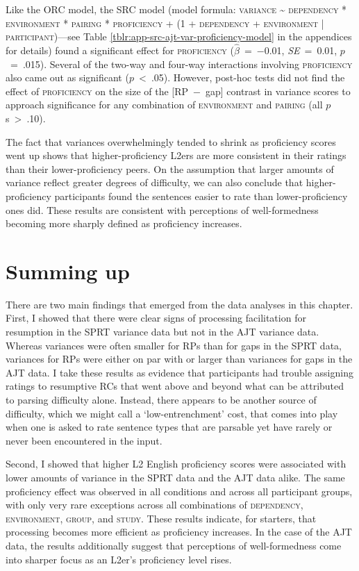 Like the ORC model, the SRC model (model formula: \textsc{variance \~{} dependency * environment * pairing * proficiency + (1 + dependency + environment | participant)}---see Table \ref{tblr:app-src-ajt-var-proficiency-model} in the appendices for details) found a significant effect for \textsc{proficiency} ($\hat{\beta}$~=~−0.01, \textit{SE}~=~0.01, $p$~=~.015). Several of the two-way and four-way interactions involving \textsc{proficiency} also came out as significant ($p$~<~.05). However, post-hoc tests did not find the effect of \textsc{proficiency} on the size of the [RP~−~gap] contrast in variance scores to approach significance for any combination of \textsc{environment} and \textsc{pairing} (all $p$s~>~.10).

The fact that variances overwhelmingly tended to shrink as proficiency scores went up shows that higher-proficiency L2ers are more consistent in their ratings than their lower-proficiency peers. On the assumption that larger amounts of variance reflect greater degrees of difficulty, we can also conclude that higher-proficiency participants found the sentences easier to rate than lower-proficiency ones did. These results are consistent with perceptions of well-formedness becoming more sharply defined as proficiency increases.

\section{Summing up}\label{var-conclusion}

There are two main findings that emerged from the data analyses in this chapter. First, I showed that there were clear signs of processing facilitation for resumption in the SPRT variance data but not in the AJT variance data. Whereas variances were often smaller for RPs than for gaps in the SPRT data, variances for RPs were either on par with or larger than variances for gaps in the AJT data. I take these results as evidence that participants had trouble assigning ratings to resumptive RCs that went above and beyond what can be attributed to parsing difficulty alone. Instead, there appears to be another source of difficulty, which we might call a `low-entrenchment' cost, that comes into play when one is asked to rate sentence types that are parsable yet have rarely or never been encountered in the input. 

Second, I showed that higher L2 English proficiency scores were associated with lower amounts of variance in the SPRT data and the AJT data alike. The same proficiency effect was observed in all conditions and across all participant groups, with only very rare exceptions across all combinations of \textsc{dependency}, \textsc{environment}, \textsc{group}, and \textsc{study}. These results indicate, for starters, that processing becomes more efficient as proficiency increases. In the case of the AJT data, the results additionally suggest that perceptions of well-formedness come into sharper focus as an L2er's proficiency level rises. 

